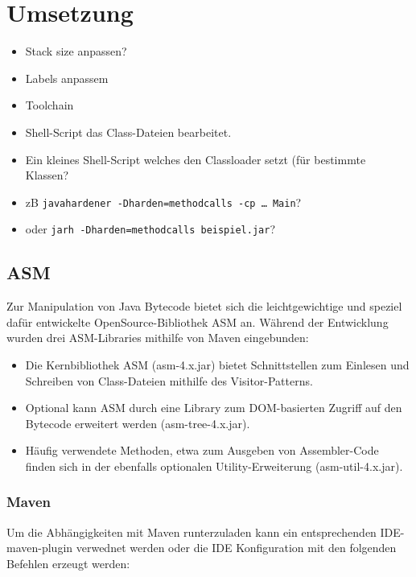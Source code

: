 
\chapter{Umsetzung}

\begin{itemize}
\item Stack size anpassen?
\item Labels anpassem
\item Toolchain
\item Shell-Script das Class-Dateien bearbeitet.
\item Ein kleines Shell-Script welches den Classloader setzt (für bestimmte Klassen?
\item zB \texttt{javahardener -Dharden=methodcalls -cp … Main}?
\item oder \texttt{jarh -Dharden=methodcalls beispiel.jar}?
\end{itemize}

\section{ASM}

Zur Manipulation von Java Bytecode bietet sich die leichtgewichtige und speziel
dafür entwickelte OpenSource-Bibliothek ASM an. Während der Entwicklung wurden
drei ASM-Libraries mithilfe von Maven eingebunden:

\begin{itemize}
\item Die Kernbibliothek ASM (asm-4.x.jar) bietet Schnittstellen zum Einlesen und Schreiben
		von Class-Dateien mithilfe des Visitor-Patterns.
\item Optional kann ASM durch eine Library zum DOM-basierten Zugriff auf den
		Bytecode erweitert werden (asm-tree-4.x.jar).
\item Häufig verwendete Methoden, etwa zum Ausgeben von Assembler-Code finden
		sich in der ebenfalls optionalen Utility-Erweiterung (asm-util-4.x.jar).
\end{itemize}

\subsection{Maven}

Um die Abhängigkeiten mit Maven runterzuladen kann ein entsprechenden IDE-maven-plugin
verwednet werden oder die IDE Konfiguration mit den folgenden Befehlen erzeugt werden:

